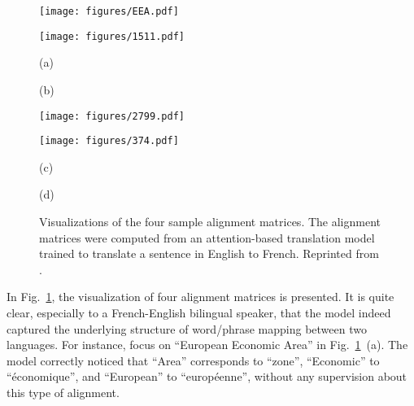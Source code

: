 \documentclass{report}
\begin{document}
\begin{figure}[ht]
    \centering
    \begin{minipage}[b]{0.48\textwidth}
        \raggedleft
        \texttt{[image: figures/EEA.pdf]}
    \end{minipage}
    \hfill
    \begin{minipage}[b]{0.48\textwidth}
        \raggedleft
        \texttt{[image: figures/1511.pdf]}
    \end{minipage}

    \begin{minipage}{0.48\textwidth}
        \centering
        (a)
    \end{minipage}
    \hfill
    \begin{minipage}{0.48\textwidth}
        \centering
        (b)
    \end{minipage}

    \begin{minipage}[b]{0.48\textwidth}
        \raggedleft
        \texttt{[image: figures/2799.pdf]}
    \end{minipage}
    \hfill
    \begin{minipage}[b]{0.48\textwidth}
        \raggedleft
        \texttt{[image: figures/374.pdf]}
    \end{minipage}

    \begin{minipage}{0.48\textwidth}
        \centering
        (c)
    \end{minipage}
    \hfill
    \begin{minipage}{0.48\textwidth}
        \centering
        (d)
    \end{minipage}

    \caption{
        Visualizations of the four sample alignment matrices. The alignment
        matrices were computed from an attention-based translation model trained
        to translate a sentence in English to French.
        Reprinted from
        \citet{bahdanau2014neural}.
    }
    \label{fig:alignment}
\end{figure}

In Fig.~\ref{fig:alignment}, the visualization of four alignment matrices is
presented. It is quite clear, especially to a French-English bilingual speaker,
that the model indeed captured the underlying structure of word/phrase mapping
between two languages. For instance, focus on ``European Economic Area'' in
Fig.~\ref{fig:alignment}~(a). The model correctly noticed that ``Area''
corresponds to ``zone'', ``Economic'' to ``\'economique'', and ``European'' to
``europ\'eenne'', without any supervision about this type of alignment.  
\end{document}
